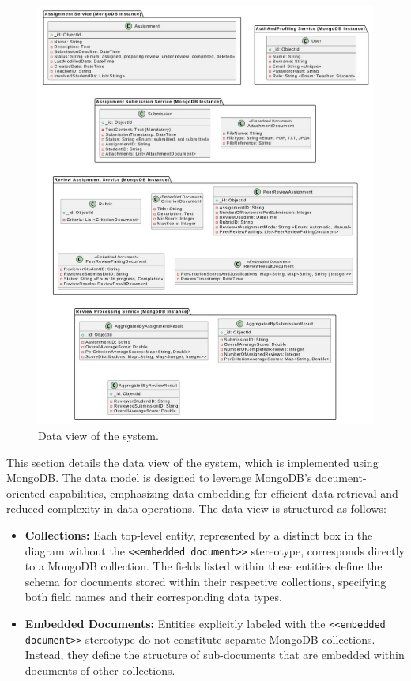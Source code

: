 \begin{figure}[h]
    \centering
    \includegraphics[width=0.9\linewidth]{Architettura/imgs/dataview.pdf}
    \caption{Data view of the system.}
    \label{fig:dataViewGlobal}
\end{figure}

\begin{justify}
    This section details the data view of the system, which is implemented using MongoDB. The data model is designed to leverage MongoDB's document-oriented capabilities, emphasizing data embedding for efficient data retrieval and reduced complexity in data operations.
The data view is structured as follows:
\end{justify}


\begin{itemize}
    \item \textbf{Collections:} Each top-level entity, represented by a distinct box in the diagram without the \texttt{<<embedded document>>} stereotype, corresponds directly to a MongoDB collection. The fields listed within these entities define the schema for documents stored within their respective collections, specifying both field names and their corresponding data types.

    \item \textbf{Embedded Documents:} Entities explicitly labeled with the \texttt{<<embedded document>>} stereotype do not constitute separate MongoDB collections. Instead, they define the structure of sub-documents that are embedded within documents of other collections.
\end{itemize}

